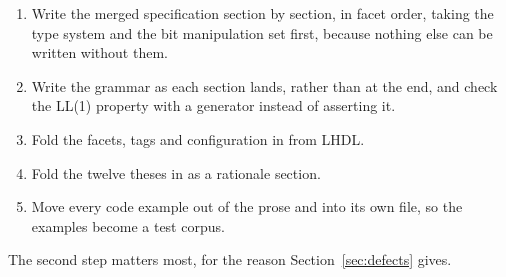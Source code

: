 \begin{enumerate}
  \item Write the merged specification section by section, in facet order,
        taking the type system and the bit manipulation set first, because
        nothing else can be written without them.
  \item Write the grammar as each section lands, rather than at the end, and
        check the LL(1) property with a generator instead of asserting it.
  \item Fold the facets, tags and configuration in from LHDL.
  \item Fold the twelve theses in as a rationale section.
  \item Move every code example out of the prose and into its own file, so
        the examples become a test corpus.
\end{enumerate}

The second step matters most, for the reason
Section~\ref{sec:defects} gives.
